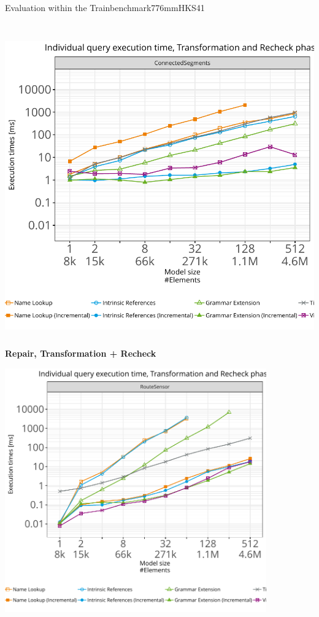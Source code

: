 \documentclass[rgb,cdgeometry=no,cd=true,cdhead=bicolor,cdfont=false,cdfoot=color,cdfont=nodin,english,paper=A0,fontsize=32pt,DIV=25,usegeometry]{tudscrposter}
\begin{document}
\begin{contentbox}[280mm]{Evaluation within the Trainbenchmark}{776mm}{HKS41}
\begin{minipage}{540mm}
\begin{minipage}{150mm}
\\[4mm]
\noindent\includegraphics[height=13cm,keepaspectratio,clip,trim=2.3cm 2.2cm 0cm 1.35cm]{images/inject-Transformation-and-Recheck-ConnectedSegments.pdf}
\end{minipage}
\begin{minipage}{170mm}
\hspace{2mm} \textbf{Repair, Transformation + Recheck}\par\vspace{2mm}
\includegraphics[height=10.5cm,keepaspectratio,clip,trim=2.3cm 4.2cm 0cm 1.35cm]{images/repair-Transformation-and-Recheck-RouteSensor.pdf}

\end{minipage}
\end{minipage}
\end{contentbox}
\end{document}
